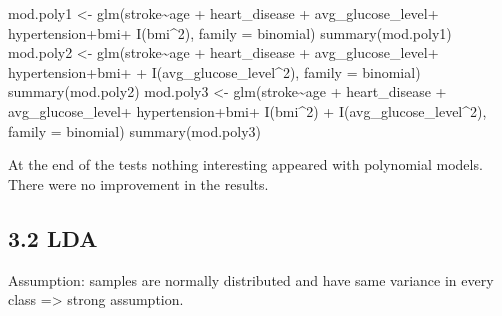 \documentclass[
]{article}
\newenvironment{Shaded}{\begin{snugshade}}{\end{snugshade}}
\newcommand{\AttributeTok}[1]{\textcolor[rgb]{0.77,0.63,0.00}{#1}}
\newcommand{\DecValTok}[1]{\textcolor[rgb]{0.00,0.00,0.81}{#1}}
\newcommand{\FunctionTok}[1]{\textcolor[rgb]{0.00,0.00,0.00}{#1}}
\newcommand{\NormalTok}[1]{#1}
\newcommand{\OtherTok}[1]{\textcolor[rgb]{0.56,0.35,0.01}{#1}}
\newcommand{\SpecialCharTok}[1]{\textcolor[rgb]{0.00,0.00,0.00}{#1}}
\begin{document}
\begin{Shaded}
\begin{Highlighting}[]
\NormalTok{mod.poly1 }\OtherTok{\textless{}{-}} \FunctionTok{glm}\NormalTok{(stroke}\SpecialCharTok{\textasciitilde{}}\NormalTok{age }\SpecialCharTok{+}\NormalTok{ heart\_disease }\SpecialCharTok{+}\NormalTok{ avg\_glucose\_level}\SpecialCharTok{+}\NormalTok{ hypertension}\SpecialCharTok{+}\NormalTok{bmi}\SpecialCharTok{+}
                       \FunctionTok{I}\NormalTok{(bmi}\SpecialCharTok{\^{}}\DecValTok{2}\NormalTok{), }\AttributeTok{family =}\NormalTok{ binomial)}
\FunctionTok{summary}\NormalTok{(mod.poly1)}
\NormalTok{mod.poly2 }\OtherTok{\textless{}{-}} \FunctionTok{glm}\NormalTok{(stroke}\SpecialCharTok{\textasciitilde{}}\NormalTok{age }\SpecialCharTok{+}\NormalTok{ heart\_disease }\SpecialCharTok{+}\NormalTok{ avg\_glucose\_level}\SpecialCharTok{+}\NormalTok{ hypertension}\SpecialCharTok{+}\NormalTok{bmi}\SpecialCharTok{+}
                     \SpecialCharTok{+} \FunctionTok{I}\NormalTok{(avg\_glucose\_level}\SpecialCharTok{\^{}}\DecValTok{2}\NormalTok{), }\AttributeTok{family =}\NormalTok{ binomial)}
\FunctionTok{summary}\NormalTok{(mod.poly2)}
\NormalTok{mod.poly3 }\OtherTok{\textless{}{-}} \FunctionTok{glm}\NormalTok{(stroke}\SpecialCharTok{\textasciitilde{}}\NormalTok{age }\SpecialCharTok{+}\NormalTok{ heart\_disease }\SpecialCharTok{+}\NormalTok{ avg\_glucose\_level}\SpecialCharTok{+}\NormalTok{ hypertension}\SpecialCharTok{+}\NormalTok{bmi}\SpecialCharTok{+}
                      \FunctionTok{I}\NormalTok{(bmi}\SpecialCharTok{\^{}}\DecValTok{2}\NormalTok{) }\SpecialCharTok{+} \FunctionTok{I}\NormalTok{(avg\_glucose\_level}\SpecialCharTok{\^{}}\DecValTok{2}\NormalTok{), }\AttributeTok{family =}\NormalTok{ binomial)}
\FunctionTok{summary}\NormalTok{(mod.poly3)}
\end{Highlighting}
\end{Shaded}

At the end of the tests nothing interesting appeared with polynomial
models. There were no improvement in the results.

\hypertarget{lda}{%
\subsection{3.2 LDA}\label{lda}}

Assumption: samples are normally distributed and have same variance in
every class =\textgreater{} strong assumption.
\end{document}
